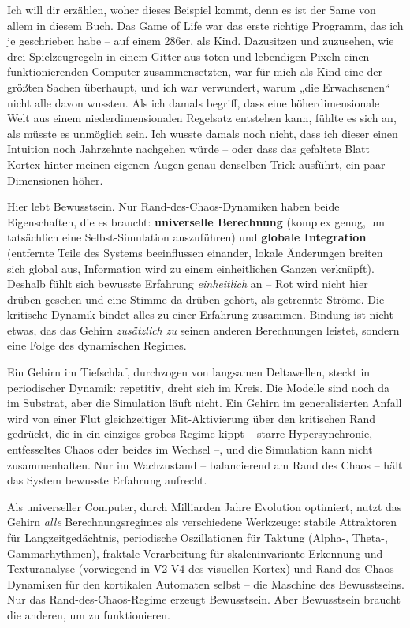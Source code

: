 \documentclass[11pt, twoside, openright]{book}
\begin{document}
Ich will dir erzählen, woher dieses Beispiel kommt, denn es ist der Same von allem in diesem Buch. Das Game of Life war das erste richtige Programm, das ich je geschrieben habe -- auf einem 286er, als Kind. Dazusitzen und zuzusehen, wie drei Spielzeugregeln in einem Gitter aus toten und lebendigen Pixeln einen funktionierenden Computer zusammensetzten, war für mich als Kind eine der größten Sachen überhaupt, und ich war verwundert, warum „die Erwachsenen“ nicht alle davon wussten. Als ich damals begriff, dass eine höherdimensionale Welt aus einem niederdimensionalen Regelsatz entstehen kann, fühlte es sich an, als müsste es unmöglich sein. Ich wusste damals noch nicht, dass ich dieser einen Intuition noch Jahrzehnte nachgehen würde -- oder dass das gefaltete Blatt Kortex hinter meinen eigenen Augen genau denselben Trick ausführt, ein paar Dimensionen höher.

Hier lebt Bewusstsein. Nur Rand-des-Chaos-Dynamiken haben beide Eigenschaften, die es braucht: \textbf{universelle Berechnung} (komplex genug, um tatsächlich eine Selbst-Simulation auszuführen) und \textbf{globale Integration} (entfernte Teile des Systems beeinflussen einander, lokale Änderungen breiten sich global aus, Information wird zu einem einheitlichen Ganzen verknüpft). Deshalb fühlt sich bewusste Erfahrung \textit{einheitlich} an -- Rot wird nicht hier drüben gesehen und eine Stimme da drüben gehört, als getrennte Ströme. Die kritische Dynamik bindet alles zu einer Erfahrung zusammen. Bindung ist nicht etwas, das das Gehirn \textit{zusätzlich zu} seinen anderen Berechnungen leistet, sondern eine Folge des dynamischen Regimes.

Ein Gehirn im Tiefschlaf, durchzogen von langsamen Deltawellen, steckt in periodischer Dynamik: repetitiv, dreht sich im Kreis. Die Modelle sind noch da im Substrat, aber die Simulation läuft nicht. Ein Gehirn im generalisierten Anfall wird von einer Flut gleichzeitiger Mit-Aktivierung über den kritischen Rand gedrückt, die in ein einziges grobes Regime kippt -- starre Hypersynchronie, entfesseltes Chaos oder beides im Wechsel --, und die Simulation kann nicht zusammenhalten. Nur im Wachzustand -- balancierend am Rand des Chaos -- hält das System bewusste Erfahrung aufrecht.

Als universeller Computer, durch Milliarden Jahre Evolution optimiert, nutzt das Gehirn \textit{alle} Berechnungsregimes als verschiedene Werkzeuge: stabile Attraktoren für Langzeitgedächtnis, periodische Oszillationen für Taktung (Alpha-, Theta-, Gammarhythmen), fraktale Verarbeitung für skaleninvariante Erkennung und Texturanalyse (vorwiegend in V2-V4 des visuellen Kortex) und Rand-des-Chaos-Dynamiken für den kortikalen Automaten selbst -- die Maschine des Bewusstseins. Nur das Rand-des-Chaos-Regime erzeugt Bewusstsein. Aber Bewusstsein braucht die anderen, um zu funktionieren.
\end{document}
